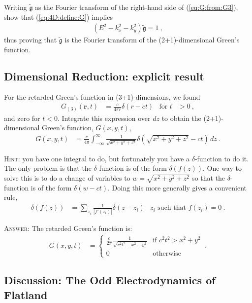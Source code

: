 \documentclass[12pt]{article}
\numberwithin{equation}{section}    %
\renewcommand{\tilde}{\widetilde}   %
\renewcommand{\vec}[1]{\mathbf{#1}} %
\begin{document}
Writing $\tilde{\mathfrak{g}}$ as the Fourier transform of the right-hand side of (\ref{eq:G:from:G3}), show that (\ref{eq:4D:define:G}) implies
\begin{align}
	\left(E^2 - k_x^2 - k_y^2\right) \tilde{\mathfrak{g}} = 1\ ,
\end{align}
thus proving that $\tilde{\mathfrak{g}}$ is the Fourier transform of the (2+1)-dimensional Green's function.

\subsection{Dimensional Reduction: explicit result}

For the retarded Green's function in (3+1)-dimensions, we found
\begin{align}
	G_{(3)}(\vec r,t) &= \frac{c}{4\pi r} \delta(r-ct)
	&
	\text{for } t&>0 \ ,
\end{align}
and zero for $t<0$. Integrate this expression over $dz$ to obtain the (2+1)-dimensional Green's function, $G(x,y,t)$,
\begin{align}
	G(x,y,t) &= \frac{c}{4\pi} \int_{-\infty}^\infty 
	\frac{1}{\sqrt{x^2+y^2 + z^2}} \delta\left(\sqrt{x^2+y^2 + z^2} - ct\right) \, dz \ .
\end{align}

\textsc{Hint:} you have one integral to do, but fortunately you have a $\delta$-function to do it. The only problem is that the $\delta$ function is of the form $\delta\left(f(z)\right)$. One way to solve this is to do a change of variables to $w = \sqrt{x^2+y^2+z^2}$ so that the $\delta$-function is of the form $\delta(w-ct)$. Doing this more generally gives a convenient rule,
\begin{align}
	\delta\left(f(z)\right) &= \sum_{z_i} \frac{1}{|f'(z_i)|} \delta(z-z_i)
	&
	z_i \text{ such that } f(z_i) = 0 \ .
\end{align}

\textsc{Answer:} The retarded Green's function is:
\begin{align}
	G(x,y,t)  &= 
	\left\{
	\begin{array}{ll}
		\frac{c}{2\pi} \frac{1}{\sqrt{c^2 t^2 - x^2 - y^2}}
		& \text{if } c^2t^2 > x^2 + y^2\\
		0 & \text{otherwise}
	\end{array}
	\right. \ .
\end{align}


\subsection{Discussion: The Odd Electrodynamics of Flatland}
\end{document}
